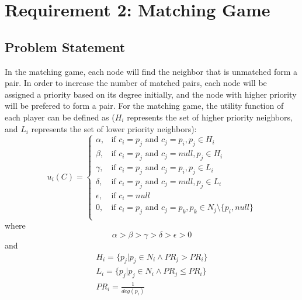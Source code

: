 \documentclass[a4paper, oneside, final, 12pt]{scrartcl} %
\begin{document}
\section{Requirement 2: Matching Game}

\subsection{Problem Statement}

In the matching game, each node will find the neighbor that is unmatched form a pair.
In order to increase the number of matched pairs,
each node will be assigned a priority based on its degree initially,
and the node with higher priority will be prefered to form a pair.
For the matching game, the utility function of each player can be defined as
($H_i$ represents the set of higher priority neighbors,
and $L_i$ represents the set of lower priority neighbors):
$$u_i(C) = 
\begin{cases}
  \alpha, & \text{if } c_i = p_j \text{ and } c_j = p_i, p_j \in H_i \\
  \beta,  & \text{if } c_i = p_j \text{ and } c_j = null, p_j \in H_i \\
  \gamma, & \text{if } c_i = p_j \text{ and } c_j = p_i, p_j \in L_i \\
  \delta, & \text{if } c_i = p_j \text{ and } c_j = null, p_j \in L_i \\
  \epsilon, & \text{if } c_i = null \\
  0, & \text{if } c_i = p_j \text{ and } c_j = p_k, p_k \in N_j \setminus \{p_i, null\} \\
\end{cases}
$$
where
$$ \alpha > \beta > \gamma > \delta > \epsilon > 0$$
and
\begin{gather*}
  H_i = \{p_j | p_j \in N_i \land PR_j > PR_i\} \\
  L_i = \{p_j | p_j \in N_i \land PR_j \le PR_i\} \\
  PR_i = \frac{1}{deg(p_i)}
\end{gather*}
\end{document}
